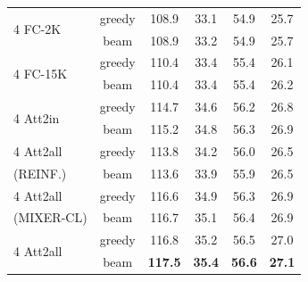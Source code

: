 \documentclass[10pt,twocolumn,letterpaper]{article}
\begin{document}
\begin{table}[t]
\begin{tabular}{l|c|cccc}
\hline
\multirow{2}{*}{4 FC-2K } & greedy & 108.9 & 33.1 & 54.9 & 25.7 \\
& beam & 108.9 & 33.2 & 54.9 & 25.7 \\
\hline
\multirow{2}{*}{4 FC-15K  } & greedy & 110.4 & 33.4 & 55.4 & 26.1 \\
& beam & 110.4 & 33.4 & 55.4 & 26.2 \\ %
\hline
\multirow{2}{*}{4 Att2in } & greedy & 114.7 & 34.6 & 56.2 & 26.8 \\ 
& beam & 115.2 & 34.8 & 56.3 & 26.9  \\ %
\hline
4 Att2all & greedy & 113.8 & 34.2 & 56.0 & 26.5 \\
(REINF.)& beam &113.6 & 33.9 & 55.9 & 26.5 \\
\hline
4 Att2all   & greedy & 116.6 & 34.9 & 56.3 & 26.9 \\
(MIXER-CL) & beam & 116.7 & 35.1  & 56.4 & 26.9 \\
\hline
\multirow{2}{*}{4 Att2all } & greedy & 116.8 & 35.2 & 56.5 & 27.0 \\
& beam & \bf 117.5 & \bf 35.4 & \bf 56.6 & \bf 27.1 \\

\end{tabular}
\end{table}
\end{document}
